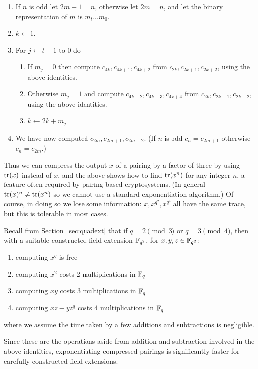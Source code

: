 \begin{enumerate}
\item
If $n$ is odd let $2m + 1 = n$, otherwise
let $2m = n$, and let the binary representation of
$m$ is $m_t ... m_0$.
\item
$k \leftarrow 1$.
\item
For $j \leftarrow t-1$ to $0$ do
\begin{enumerate}
\item
If $m_j = 0$ then
compute $c_{4k}, c_{4k+1}, c_{4k+2}$ from $c_{2k}, c_{2k+1}, c_{2k+2}$,
using the above identities.
\item
Otherwise $m_j = 1$ and
compute $c_{4k+2}, c_{4k+3}, c_{4k+4}$ from $c_{2k}, c_{2k+1}, c_{2k+2}$,
using the above identities.
\item
$k \leftarrow 2 k + m_j$
\end{enumerate}
\item
We have now computed $c_{2m}, c_{2m+1}, c_{2m+2}$. (If $n$ is odd
$c_n = c_{2m+1}$ otherwise $c_n = c_{2m}$.)
\end{enumerate}

Thus we can compress the output $x$ of a pairing by a factor of three by
using $\mathop{\rm tr}(x)$ instead of $x$, and the above shows how to find
$\mathop{\rm tr}(x^n)$ for any integer $n$,
a feature often required by pairing-based cryptosystems.
(In general $\mathop{\rm tr}(x)^n \ne \mathop{\rm tr}(x^n)$ so we cannot use a standard
exponentiation algorithm.)
Of course, in doing so we lose some information: $x, x^{q^2}, x^{q^4}$
all have the same trace, but this is tolerable in most cases.

Recall from Section~\ref{sec:quadext} that
if $q = 2 \pmod 3$ or $q = 3 \pmod 4$, then with a suitable constructed
field extension $\mathbb{F}_{q^2}$, for $x, y, z \in \mathbb{F}_{q^2}$:
\begin{enumerate}
\item
computing $x^q$ is free
\item
computing $x^2$ costs 2 multiplications in $\mathbb{F}_q$
\item
computing $x y$ costs 3 multiplications in $\mathbb{F}_q$
\item
computing $x z - y z^q$ costs 4 multiplications in $\mathbb{F}_q$
\end{enumerate}
where we assume the time taken by a few
additions and subtractions is negligible.

Since these are the operations aside from addition and
subtraction involved in the above identities,
exponentiating compressed pairings is
significantly faster for carefully constructed field extensions.

